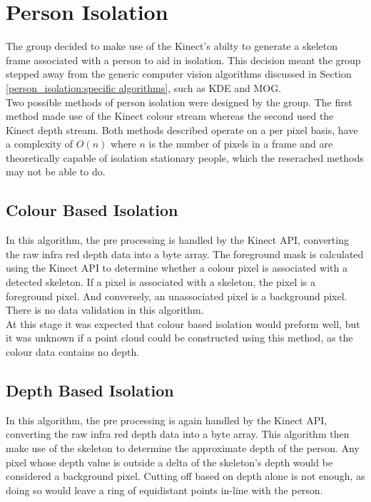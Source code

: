 \section{Person Isolation}
\label{design:person isolation}
The group decided to make use of the Kinect's abilty to generate a skeleton frame associated with a person to aid in isolation. This decision meant the group stepped away from the generic computer vision algorithms discussed in Section \ref{person_isolation:specific algorithms}, such as KDE and MOG.\\

Two possible methods of person isolation were designed by the group. The first method made use of the Kinect colour stream whereas the second used the Kinect depth stream. Both methods described operate on a per pixel basis, have a complexity of $O(n)$ where $n$ is the number of pixels in a frame and are theoretically capable of isolation stationary people, which the reserached methods may not be able to do.\\

\subsection{Colour Based Isolation}
\label{design:colour based isolation}
In this algorithm, the pre processing is handled by the Kinect API, converting the raw infra red depth data into a byte array. The foreground mask is calculated using the Kinect API to determine whether a colour pixel is associated with a detected skeleton. If a pixel is associated with a skeleton, the pixel is a foreground pixel. And conversely, an unassociated pixel is a background pixel. There is no data validation in this algorithm.\\

At this stage it was expected that colour based isolation would preform well, but it was unknown if a point cloud could be constructed using this method, as the colour data contains no depth.\\

\subsection{Depth Based Isolation}
\label{design:depth based isolation}

In this algorithm, the pre processing is again handled by the Kinect API, converting the raw infra red depth data into a byte array. This algorithm then make use of the skeleton to determine the approximate depth of the person. Any pixel whose depth value is outside a delta of the skeleton's depth would be considered a background pixel. Cutting off based on depth alone is not enough, as doing so would leave a ring of equidistant points in-line with the person.\\

